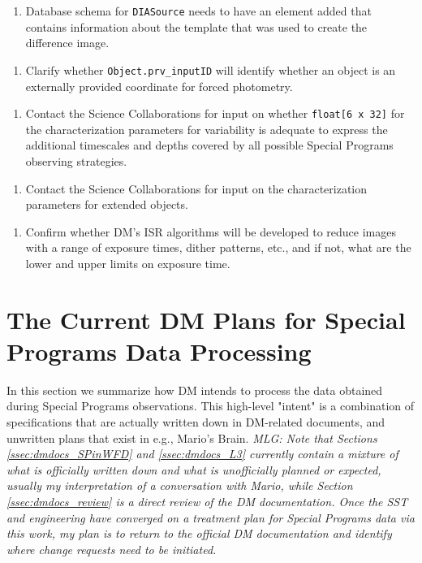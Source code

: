 \documentclass[DM,lsstdraft,toc]{lsstdoc}
\begin{document}
\begin{enumerate}[resume,topsep=-15pt,label= \textbf{Action \Roman*.}] \item Database schema for {\tt DIASource} needs to have an element added that contains information about the template that was used to create the difference image. \end{enumerate}
\begin{enumerate}[resume,topsep=-15pt,label= \textbf{Action \Roman*.}] \item Clarify whether {\tt Object.prv\_inputID} will identify whether an object is an externally provided coordinate for forced photometry. \end{enumerate}
\begin{enumerate}[resume,topsep=-15pt,label= \textbf{Action \Roman*.}] \item Contact the Science Collaborations for input on whether {\tt float[6 x 32]} for the characterization parameters for variability is adequate to express the additional timescales and depths covered by all possible Special Programs observing strategies. \end{enumerate}
\begin{enumerate}[resume,topsep=-15pt,label= \textbf{Action \Roman*.}] \item Contact the Science Collaborations for input on the characterization parameters for extended objects. \end{enumerate}
\begin{enumerate}[resume,topsep=-15pt,label= \textbf{Action \Roman*.}] \item Confirm whether DM's ISR algorithms will be developed to reduce images with a range of exposure times, dither patterns, etc., and if not, what are the lower and upper limits on exposure time. \end{enumerate}



\clearpage
\section{The Current DM Plans for Special Programs Data Processing} \label{sec:dmdocs}

In this section we summarize how DM intends to process the data obtained during Special Programs observations. This high-level "intent" is a combination of specifications that are actually written down in DM-related documents, and unwritten plans that exist in e.g., Mario's Brain. {\it MLG: Note that Sections \ref{ssec:dmdocs_SPinWFD} and \ref{ssec:dmdocs_L3} currently contain a mixture of what is officially written down and what is unofficially planned or expected, usually my interpretation of a conversation with Mario, while Section \ref{ssec:dmdocs_review} is a direct review of the DM documentation. Once the SST and engineering have converged on a treatment plan for Special Programs data via this work, my plan is to return to the official DM documentation and identify where change requests need to be initiated.}
\end{document}
